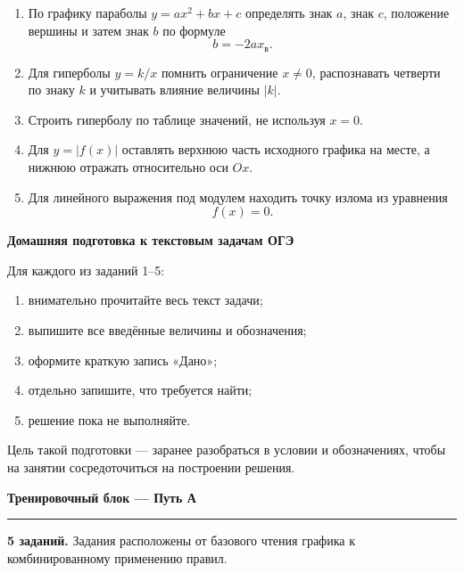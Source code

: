 \documentclass[a4paper,12pt]{article}
\newcommand{\topic}[1]{%
  \vspace{0.25em}
  {\Large\bfseries\color{darkaccent}#1}\par
  \vspace{0.1em}
  {\color{accent}\rule{\linewidth}{0.7pt}}\par
  \vspace{0.35em}
}
\newcommand{\subtopic}[1]{%
  \vspace{0.35em}
  {\large\bfseries\color{darkaccent}#1}\par
  \vspace{0.1em}
}
\begin{document}
\begin{enumerate}
  \item
  По графику параболы $y=ax^2+bx+c$ определять знак $a$,
  знак $c$, положение вершины и затем знак $b$ по формуле
  \[
    b=-2ax_{\text{в}}.
  \]

  \item
  Для гиперболы $y=k/x$ помнить ограничение $x\ne0$,
  распознавать четверти по знаку $k$ и учитывать влияние величины $|k|$.

  \item
  Строить гиперболу по таблице значений, не используя $x=0$.

  \item
  Для $y=|f(x)|$ оставлять верхнюю часть исходного графика на месте,
  а нижнюю отражать относительно оси $Ox$.

  \item
  Для линейного выражения под модулем находить точку излома из уравнения
  \[
    f(x)=0.
  \]
\end{enumerate}

\subtopic{Домашняя подготовка к текстовым задачам ОГЭ}

Для каждого из заданий 1--5:
\begin{enumerate}
  \item внимательно прочитайте весь текст задачи;
  \item выпишите все введённые величины и обозначения;
  \item оформите краткую запись «Дано»;
  \item отдельно запишите, что требуется найти;
  \item решение пока не выполняйте.
\end{enumerate}

Цель такой подготовки --- заранее разобраться в условии и обозначениях,
чтобы на занятии сосредоточиться на построении решения.


\clearpage

\topic{Тренировочный блок --- Путь А}

\begingroup
\small
{}

\textbf{5 заданий.}
Задания расположены от базового чтения графика к комбинированному применению правил.
\end{document}
